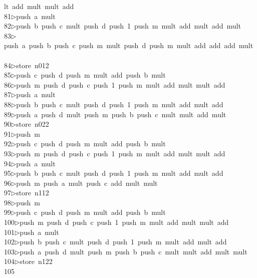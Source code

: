 \begin{tabbing}
\>lt\ add\ mult\ mult\ add\ \\[0pt]
81\>$\triangleright$\>push\ a\ mult\ \\[0pt]
82\>$\triangleright$\>push\ b\ push\ c\ mult\ push\ d\ push\ 1\ push\ m\ mult\ add\ mult\ add\ mult\ \\[0pt]
83\>$\triangleright$\>push\ a\ push\ b\ push\ c\ push\ m\ mult\ push\ d\ push\ m\ mult\ add\ add\ add\ mult\ \\[0pt]
84\>$\triangleright$\>store\ n012\ \\[0pt]
85\>$\triangleright$\>push\ c\ push\ d\ push\ m\ mult\ add\ push\ b\ mult\ \\[0pt]
86\>$\triangleright$\>push\ m\ push\ d\ push\ c\ push\ 1\ push\ m\ mult\ add\ mult\ mult\ add\ \\[0pt]
87\>$\triangleright$\>push\ a\ mult\ \\[0pt]
88\>$\triangleright$\>push\ b\ push\ c\ mult\ push\ d\ push\ 1\ push\ m\ mult\ add\ mult\ add\ \\[0pt]
89\>$\triangleright$\>push\ a\ push\ d\ mult\ push\ m\ push\ b\ push\ c\ mult\ mult\ add\ mult\ \\[0pt]
90\>$\triangleright$\>store\ n022\ \\[0pt]
91\>$\triangleright$\>push\ m\ \\[0pt]
92\>$\triangleright$\>push\ c\ push\ d\ push\ m\ mult\ add\ push\ b\ mult\ \\[0pt]
93\>$\triangleright$\>push\ m\ push\ d\ push\ c\ push\ 1\ push\ m\ mult\ add\ mult\ mult\ add\ \\[0pt]
94\>$\triangleright$\>push\ a\ mult\ \\[0pt]
95\>$\triangleright$\>push\ b\ push\ c\ mult\ push\ d\ push\ 1\ push\ m\ mult\ add\ mult\ add\ \\[0pt]
96\>$\triangleright$\>push\ m\ push\ a\ mult\ push\ c\ add\ mult\ mult\ \\[0pt]
97\>$\triangleright$\>store\ n112\ \\[0pt]
98\>$\triangleright$\>push\ m\ \\[0pt]
99\>$\triangleright$\>push\ c\ push\ d\ push\ m\ mult\ add\ push\ b\ mult\ \\[0pt]
100\>$\triangleright$\>push\ m\ push\ d\ push\ c\ push\ 1\ push\ m\ mult\ add\ mult\ mult\ add\ \\[0pt]
101\>$\triangleright$\>push\ a\ mult\ \\[0pt]
102\>$\triangleright$\>push\ b\ push\ c\ mult\ push\ d\ push\ 1\ push\ m\ mult\ add\ mult\ add\ \\[0pt]
103\>$\triangleright$\>push\ a\ push\ d\ mult\ push\ m\ push\ b\ push\ c\ mult\ mult\ add\ mult\ mult\ \\[0pt]
104\>$\triangleright$\>store\ n122\ \\[0pt]
105\>\end{tabbing}
